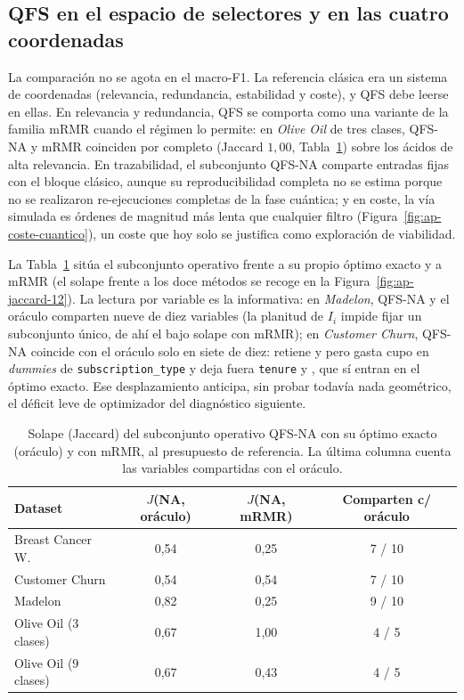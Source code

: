 \subsection{QFS en el espacio de selectores y en las cuatro coordenadas}
\label{sec:espacio-metodos-qfs}

La comparación no se agota en el macro-F1. La referencia clásica era un
sistema de coordenadas (relevancia, redundancia, estabilidad y coste), y
QFS debe leerse en ellas. En relevancia y redundancia, QFS se comporta
como una variante de la familia mRMR cuando el régimen lo permite: en
\textit{Olive Oil} de tres clases, QFS-NA y mRMR coinciden por completo
(Jaccard $1{,}00$, Tabla~\ref{tab:qfs-solape}) sobre los ácidos de alta
relevancia. En trazabilidad, el subconjunto QFS-NA comparte entradas
fijas con el bloque clásico, aunque su reproducibilidad completa no se
estima porque no se realizaron re-ejecuciones completas de la fase
cuántica; y en coste, la vía simulada es
órdenes de magnitud más lenta que cualquier filtro (Figura~\ref{fig:ap-coste-cuantico}), un coste que hoy solo se justifica
como exploración de viabilidad.


La Tabla~\ref{tab:qfs-solape} sitúa el subconjunto operativo frente a su
propio óptimo exacto y a mRMR (el solape frente a los doce métodos se
recoge en la Figura~\ref{fig:ap-jaccard-12}). La lectura
por variable es la informativa: en \textit{Madelon}, QFS-NA y el oráculo
comparten nueve de diez variables (la planitud de $I_i$ impide fijar un
subconjunto único, de ahí el bajo solape con mRMR); en \textit{Customer
Churn}, QFS-NA coincide con el oráculo solo en siete de diez: retiene
 y  pero gasta cupo en
\textit{dummies} de \texttt{subscription\_type} y deja fuera
\texttt{tenure} y , que sí entran en el óptimo
exacto. Ese desplazamiento anticipa, sin probar todavía nada geométrico,
el déficit leve de optimizador del diagnóstico siguiente.


\begin{table}[!htbp]
  \centering
  \caption[Solape del subconjunto QFS-NA con el oráculo y con mRMR]{Solape
    (Jaccard) del subconjunto operativo QFS-NA con su óptimo exacto
    (oráculo) y con mRMR, al presupuesto de referencia. La última columna
    cuenta las variables compartidas con el oráculo.}
  \label{tab:qfs-solape}
  \small
  \begin{tabular}{lccc}
    \toprule
    Dataset & $J$(NA, oráculo) & $J$(NA, mRMR) & Comparten c/ oráculo \\
    \midrule
    Breast Cancer W. & 0{,}54 & 0{,}25 & 7 / 10 \\
    Customer Churn & 0{,}54 & 0{,}54 & 7 / 10 \\
    Madelon & 0{,}82 & 0{,}25 & 9 / 10 \\
    Olive Oil (3 clases) & 0{,}67 & 1{,}00 & 4 / 5 \\
    Olive Oil (9 clases) & 0{,}67 & 0{,}43 & 4 / 5 \\
    \bottomrule
  \end{tabular}
\end{table}
\FloatBarrier

